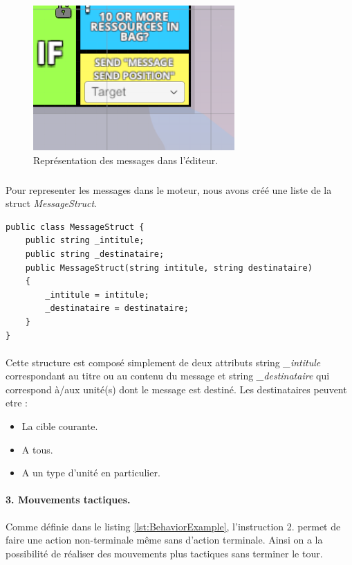 \documentclass{report}
\begin{document}
\begin{figure}[!h]
       \centering
	\includegraphics[scale=0.55]{PuzzleMessageImage}
	\caption{Représentation des messages dans l'éditeur.}
\end{figure}

\subparagraph{} 
Pour representer les messages dans le moteur, nous avons créé une liste de la struct \textit{MessageStruct}.

 \begin{lstlisting}[language={[Sharp]C},label={lst:MessageStructScript}, caption= Code du script MessageStruct.cs]
public class MessageStruct {
    public string _intitule;
    public string _destinataire;
    public MessageStruct(string intitule, string destinataire)
    {
        _intitule = intitule;
        _destinataire = destinataire;
    }
}
\end{lstlisting}

\paragraph{}
Cette structure est composé simplement de deux attributs string \textit{\_intitule} correspondant au titre ou au contenu du message et string \textit{\_destinataire} qui correspond à/aux unité(s) dont le message est destiné. Les destinataires peuvent etre :
\begin{itemize}
\item La cible courante.
\item A tous.
\item A un type d'unité en particulier.
\end{itemize}

\paragraph{3. Mouvements tactiques.}
Comme définie dans le listing \ref{lst:BehaviorExample}, l'instruction 2. permet de faire une action non-terminale même sans d'action terminale.
Ainsi on a la possibilité de réaliser des mouvements plus tactiques sans terminer le tour.
\end{document}
